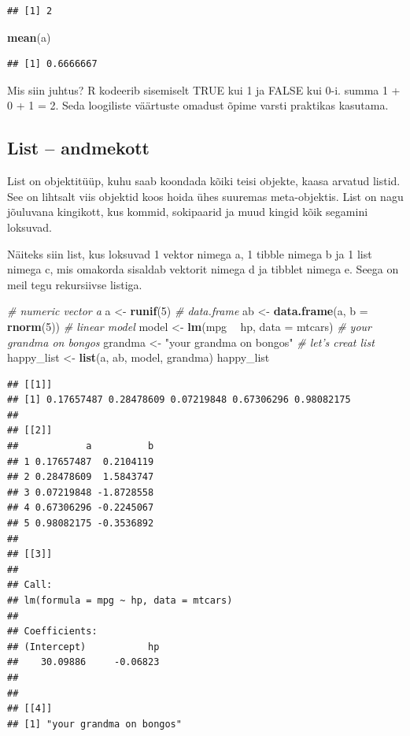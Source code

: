 \documentclass[]{book}
\newenvironment{Shaded}{\begin{snugshade}}{\end{snugshade}}
\newcommand{\KeywordTok}[1]{\textcolor[rgb]{0.13,0.29,0.53}{\textbf{#1}}}
\newcommand{\DataTypeTok}[1]{\textcolor[rgb]{0.13,0.29,0.53}{#1}}
\newcommand{\DecValTok}[1]{\textcolor[rgb]{0.00,0.00,0.81}{#1}}
\newcommand{\StringTok}[1]{\textcolor[rgb]{0.31,0.60,0.02}{#1}}
\newcommand{\CommentTok}[1]{\textcolor[rgb]{0.56,0.35,0.01}{\textit{#1}}}
\newcommand{\OperatorTok}[1]{\textcolor[rgb]{0.81,0.36,0.00}{\textbf{#1}}}
\newcommand{\NormalTok}[1]{#1}
\begin{document}
\begin{verbatim}
## [1] 2
\end{verbatim}

\begin{Shaded}
\begin{Highlighting}[]
\KeywordTok{mean}\NormalTok{(a)}
\end{Highlighting}
\end{Shaded}

\begin{verbatim}
## [1] 0.6666667
\end{verbatim}

Mis siin juhtus? R kodeerib sisemiselt TRUE kui 1 ja FALSE kui 0-i.
summa 1 + 0 + 1 = 2. Seda loogiliste väärtuste omadust õpime varsti
praktikas kasutama.

\subsection{List -- andmekott}\label{list-andmekott}

List on objektitüüp, kuhu saab koondada kõiki teisi objekte, kaasa
arvatud listid. See on lihtsalt viis objektid koos hoida ühes suuremas
meta-objektis. List on nagu jõuluvana kingikott, kus kommid, sokipaarid
ja muud kingid kõik segamini loksuvad.

Näiteks siin list, kus loksuvad 1 vektor nimega a, 1 tibble nimega b ja
1 list nimega c, mis omakorda sisaldab vektorit nimega d ja tibblet
nimega e. Seega on meil tegu rekursiivse listiga.

\begin{Shaded}
\begin{Highlighting}[]
\CommentTok{# numeric vector a}
\NormalTok{a <-}\StringTok{ }\KeywordTok{runif}\NormalTok{(}\DecValTok{5}\NormalTok{)}
\CommentTok{# data.frame}
\NormalTok{ab <-}\StringTok{ }\KeywordTok{data.frame}\NormalTok{(a, }\DataTypeTok{b =} \KeywordTok{rnorm}\NormalTok{(}\DecValTok{5}\NormalTok{))}
\CommentTok{# linear model}
\NormalTok{model <-}\StringTok{ }\KeywordTok{lm}\NormalTok{(mpg }\OperatorTok{~}\StringTok{ }\NormalTok{hp, }\DataTypeTok{data =}\NormalTok{ mtcars)}
\CommentTok{# your grandma on bongos}
\NormalTok{grandma <-}\StringTok{ "your grandma on bongos"}
\CommentTok{# let's creat list}
\NormalTok{happy_list <-}\StringTok{ }\KeywordTok{list}\NormalTok{(a, ab, model, grandma)}
\NormalTok{happy_list}
\end{Highlighting}
\end{Shaded}

\begin{verbatim}
## [[1]]
## [1] 0.17657487 0.28478609 0.07219848 0.67306296 0.98082175
## 
## [[2]]
##            a          b
## 1 0.17657487  0.2104119
## 2 0.28478609  1.5843747
## 3 0.07219848 -1.8728558
## 4 0.67306296 -0.2245067
## 5 0.98082175 -0.3536892
## 
## [[3]]
## 
## Call:
## lm(formula = mpg ~ hp, data = mtcars)
## 
## Coefficients:
## (Intercept)           hp  
##    30.09886     -0.06823  
## 
## 
## [[4]]
## [1] "your grandma on bongos"
\end{verbatim}
\end{document}
